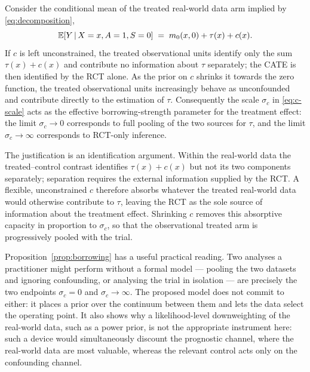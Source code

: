 \begin{proposition}
\label{prop:borrowing}
Consider the conditional mean of the treated real-world data arm implied by
\eqref{eq:decomposition},
\[
\mathbb{E}[Y \,\vert\, X = x, A = 1, S = 0] \;=\; m_0(x, 0) + \tau(x) + c(x).
\]
If $c$ is left unconstrained, the treated observational units identify only the
sum $\tau(x) + c(x)$ and contribute no information about $\tau$ separately; the
CATE is then identified by the RCT alone. As the prior on $c$ shrinks it
towards the zero function, the treated observational units increasingly behave
as unconfounded and contribute directly to the estimation of $\tau$.
Consequently the scale $\sigma_c$ in \eqref{eq:c-scale} acts as the effective
borrowing-strength parameter for the treatment effect: the limit
$\sigma_c \to 0$ corresponds to full pooling of the two sources for $\tau$,
and the limit $\sigma_c \to \infty$ corresponds to RCT-only inference.
\end{proposition}

\noindent
The justification is an identification argument. Within the real-world data
the treated--control contrast identifies $\tau(x) + c(x)$ but not its two
components separately; separation requires the external information supplied by
the RCT. A flexible, unconstrained $c$ therefore absorbs whatever the treated
real-world data would otherwise contribute to $\tau$, leaving the RCT as the
sole source of information about the treatment effect. Shrinking $c$ removes
this absorptive capacity in proportion to $\sigma_c$, so that the observational
treated arm is progressively pooled with the trial.

Proposition~\ref{prop:borrowing} has a useful practical reading. Two analyses a
practitioner might perform without a formal model --- pooling the two datasets
and ignoring confounding, or analysing the trial in isolation --- are precisely
the two endpoints $\sigma_c = 0$ and $\sigma_c \to \infty$. The proposed model
does not commit to either: it places a prior over the continuum between them and
lets the data select the operating point. It also shows why a likelihood-level
downweighting of the real-world data, such as a power prior, is not the
appropriate instrument here: such a device would simultaneously discount the
prognostic channel, where the real-world data are most valuable, whereas the
relevant control acts only on the confounding channel.

